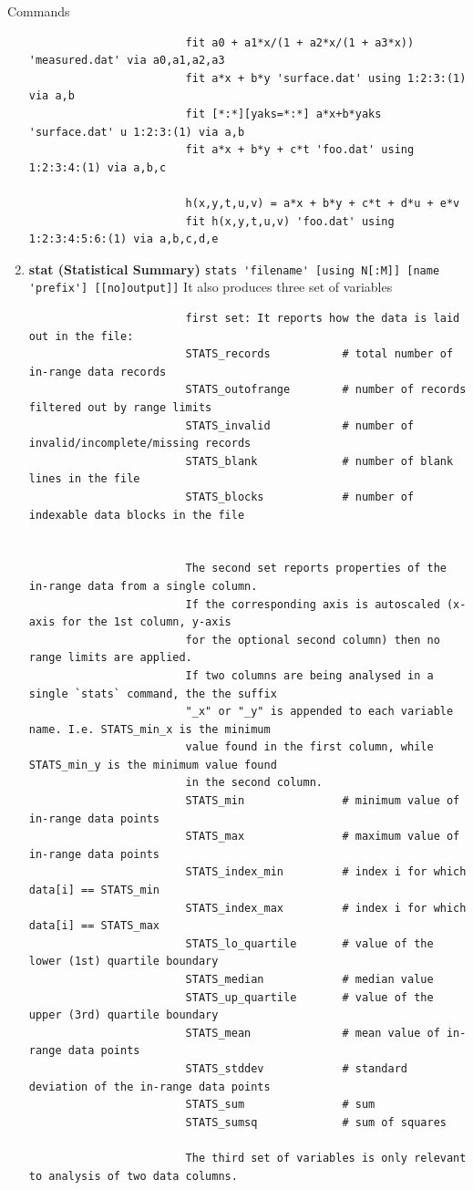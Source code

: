 \documentclass{beamer}
\begin{document}
\begin{frame}{Commands}
\begin{enumerate}
\begin{verbatim}
						fit a0 + a1*x/(1 + a2*x/(1 + a3*x)) 'measured.dat' via a0,a1,a2,a3
						fit a*x + b*y 'surface.dat' using 1:2:3:(1) via a,b
						fit [*:*][yaks=*:*] a*x+b*yaks 'surface.dat' u 1:2:3:(1) via a,b
						fit a*x + b*y + c*t 'foo.dat' using 1:2:3:4:(1) via a,b,c
						
						h(x,y,t,u,v) = a*x + b*y + c*t + d*u + e*v
						fit h(x,y,t,u,v) 'foo.dat' using 1:2:3:4:5:6:(1) via a,b,c,d,e
					\end{verbatim}
	
			\item 	\textbf{stat (Statistical Summary)} 
					\verb|stats 'filename' [using N[:M]] [name 'prefix'] [[no]output]]|
					It also produces three set of variables
					\begin{verbatim}
						first set: It reports how the data is laid out in the file:
						STATS_records           # total number of in-range data records
						STATS_outofrange        # number of records filtered out by range limits
						STATS_invalid           # number of invalid/incomplete/missing records
						STATS_blank             # number of blank lines in the file
						STATS_blocks            # number of indexable data blocks in the file
						
						
						The second set reports properties of the in-range data from a single column. 
						If the corresponding axis is autoscaled (x-axis for the 1st column, y-axis 
						for the optional second column) then no range limits are applied. 
						If two columns are being analysed in a single `stats` command, the the suffix 
						"_x" or "_y" is appended to each variable name. I.e. STATS_min_x is the minimum 
						value found in the first column, while STATS_min_y is the minimum value found 
						in the second column.
						STATS_min               # minimum value of in-range data points
						STATS_max               # maximum value of in-range data points
						STATS_index_min         # index i for which data[i] == STATS_min
						STATS_index_max         # index i for which data[i] == STATS_max
						STATS_lo_quartile       # value of the lower (1st) quartile boundary
						STATS_median            # median value
						STATS_up_quartile       # value of the upper (3rd) quartile boundary
						STATS_mean              # mean value of in-range data points
						STATS_stddev            # standard deviation of the in-range data points
						STATS_sum               # sum
						STATS_sumsq             # sum of squares
										     
						The third set of variables is only relevant to analysis of two data columns.
										

\end{verbatim}
\end{enumerate}
\end{frame}
\end{document}
